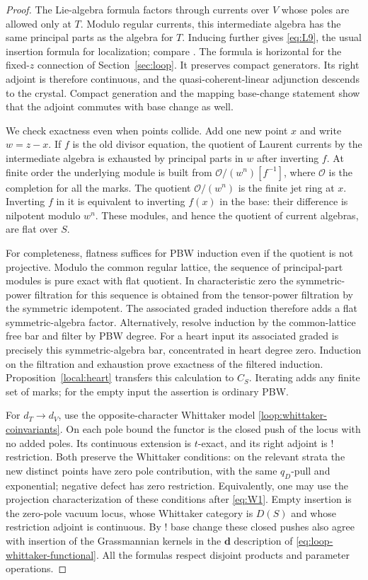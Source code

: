 \documentclass[11pt]{article}
\numberwithin{equation}{section}
\theoremstyle{definition}
\theoremstyle{remark}
\begin{document}
\begin{proof}
The Lie-algebra formula factors through currents over $V$ whose
poles are allowed only at $T$.  Modulo regular currents, this
intermediate algebra has the same principal parts as the algebra
for $T$.  Inducing further gives \eqref{eq:L9}, the usual insertion
formula for localization; compare \cite{GLCII}.  The formula is
horizontal for the fixed-$z$ connection of
Section~\ref{sec:loop}.  It preserves compact generators.  Its
right adjoint is therefore continuous, and the quasi-coherent-linear
adjunction descends to the crystal.  Compact generation and the
mapping base-change statement show that the adjoint commutes with
base change as well.

We check exactness even when points collide.  Add one new point $x$
and write $w=z-x$.  If $f$ is the old divisor equation, the quotient
of Laurent currents by the intermediate algebra is exhausted by
principal parts in $w$ after inverting $f$.  At finite order the
underlying module is built from
$\mathcal O/(w^n)[f^{-1}]$, where $\mathcal O$ is the completion
for all the marks.  The quotient $\mathcal O/(w^n)$ is the finite
jet ring at $x$.  Inverting $f$ in it is equivalent to inverting
$f(x)$ in the base: their difference is nilpotent modulo $w^n$.
These modules, and hence the quotient of current algebras, are flat
over $S$.

For completeness, flatness suffices for PBW induction even if the
quotient is not projective.  Modulo the common regular lattice, the
sequence of principal-part modules is pure exact with flat quotient.
In characteristic zero the symmetric-power filtration for this
sequence is obtained from the tensor-power filtration by the
symmetric idempotent.  The associated graded induction therefore
adds a flat symmetric-algebra factor.  Alternatively, resolve
induction by the common-lattice free bar and filter by PBW degree.
For a heart input its associated graded is precisely this
symmetric-algebra bar, concentrated in heart degree zero.
Induction on the filtration and exhaustion prove exactness of the
filtered induction.  Proposition~\ref{local:heart} transfers this
calculation to $C_S$.  Iterating adds any finite set of marks;
for the empty input the assertion is ordinary PBW.

For $d_T\to d_V$, use the opposite-character Whittaker model
\eqref{loop:whittaker-coinvariants}.  On each pole bound the functor is the closed push
of the locus with no added poles.  Its continuous extension is
$t$-exact, and its right adjoint is ! restriction.  Both preserve
the Whittaker conditions: on the relevant strata the new distinct
points have zero pole contribution, with the same $q_D$-pull and
exponential; negative defect has zero restriction.  Equivalently,
one may use the projection characterization of these conditions
after \eqref{eq:W1}.  Empty insertion is the zero-pole vacuum
locus, whose Whittaker category is $D(S)$ and whose restriction
adjoint is continuous.  By ! base change these closed pushes also
agree with insertion of the Grassmannian kernels in the
$\mathbf d$ description of \eqref{eq:loop-whittaker-functional}.  All the formulas
respect disjoint products and parameter operations.
\end{proof}
\end{document}
